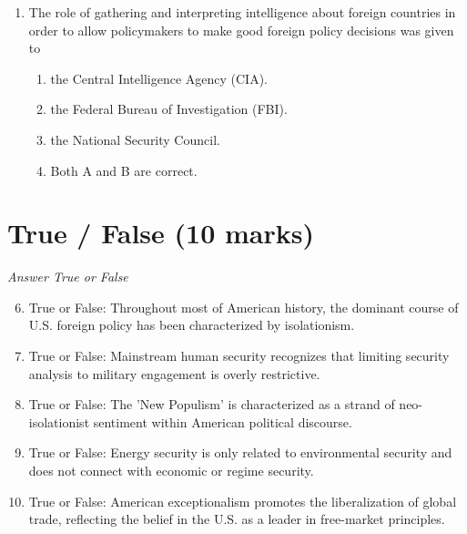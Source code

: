 \documentclass[12pt]{article}
\begin{document}
\begin{enumerate}[label=\arabic*.]
\begin{enumerate}[label=(\alph*)]
    \item Critical questioning.
    \item Realist logic.
    \item State-centric security analysis.
    \item All of these options.
\end{enumerate}
\item The role of gathering and interpreting intelligence about foreign countries in order to allow policymakers to make good foreign policy decisions was given to
\begin{enumerate}[label=(\alph*)]
    \item the Central Intelligence Agency (CIA).
    \item the Federal Bureau of Investigation (FBI).
    \item the National Security Council.
    \item Both A and B are correct.
\end{enumerate}
\end{enumerate}

\section*{True / False (10 marks)}
\textit{Answer True or False}
\begin{enumerate}[label=\arabic*.]
\setcounter{enumi}{5}
\item True or False: Throughout most of American history, the dominant course of U.S. foreign policy has been characterized by isolationism.
\item True or False: Mainstream human security recognizes that limiting security analysis to military engagement is overly restrictive.
\item True or False: The 'New Populism' is characterized as a strand of neo-isolationist sentiment within American political discourse.
\item True or False: Energy security is only related to environmental security and does not connect with economic or regime security.
\item True or False: American exceptionalism promotes the liberalization of global trade, reflecting the belief in the U.S. as a leader in free-market principles.
\end{enumerate}
\end{document}
